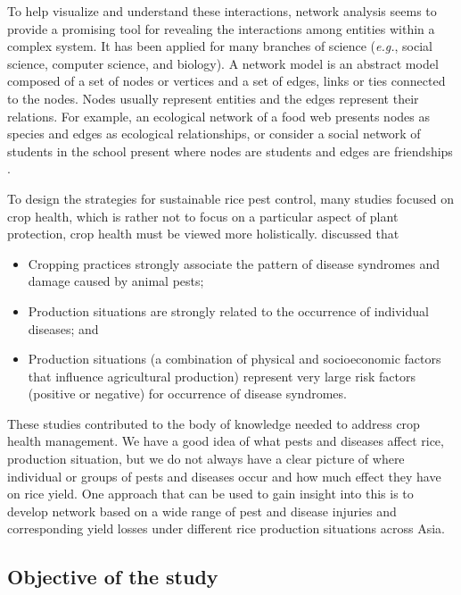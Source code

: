 To help visualize and understand these interactions, network analysis seems to provide a promising tool for revealing the interactions among entities within a complex system. It has been applied for many branches of science (\textit{e.g.}, social science, computer science, and biology). A network model is an abstract model composed of a set of nodes or vertices and a set of edges, links or ties connected to the nodes. Nodes usually represent entities and the edges represent their relations. For example, an ecological network of a food web presents nodes as species \citep{krause2003compartments} and edges as ecological relationships, or consider a social network of students in the school present where nodes are students and edges are friendships \citep{moody2001race}.

To design the strategies for sustainable  rice pest control, many studies focused on crop health, which is rather not to focus on a particular aspect of plant protection, crop health must be viewed more holistically. \cite{savary1995use,Savary:2000vr,savary2005multiple} discussed that

\begin{itemize}
\item Cropping practices strongly associate the pattern of disease syndromes and damage caused by animal pests;
\item Production situations are strongly related to the occurrence of  individual diseases; and
\item Production situations (a combination of physical and socioeconomic factors that influence agricultural production) represent very large risk factors (positive or negative) for occurrence of disease syndromes. 
\end{itemize}
 
These studies contributed to the body of knowledge needed to address crop health management. We have a good idea of what pests and diseases affect rice, production situation, but we do not always have a clear picture of where individual or groups of pests and diseases occur and how much effect they have on rice yield. One approach that can be used to gain insight into this is to develop network based on a wide range of pest and disease injuries and corresponding yield losses under different rice production situations across Asia. 

\subsection{Objective of the study}

